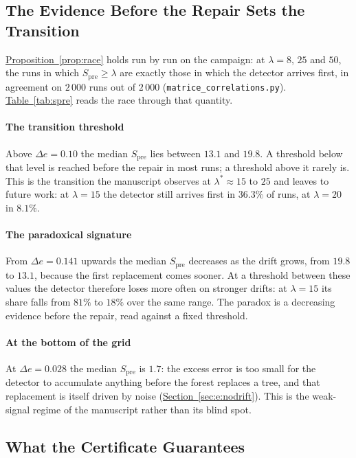 \documentclass[10pt,conference]{IEEEtran}
\theoremstyle{definition}
\begin{document}
\subsection{The Evidence Before the Repair Sets the Transition}
\label{sec:spre}


\hyperref[prop:race]{Proposition~\ref*{prop:race}} holds run by run on the campaign: at $\lambda = 8$, $25$ and
$50$, the runs in which $S_{\mathrm{pre}} \ge \lambda$ are exactly those in which the
detector arrives first, in agreement on $2\,000$ runs out of $2\,000$
(\texttt{matrice\_correlations.py}). \hyperref[tab:spre]{Table~\ref*{tab:spre}} reads the race through that
quantity.

\paragraph{The transition threshold} Above $\Delta e = 0.10$ the median $S_{\mathrm{pre}}$
lies between $13.1$ and $19.8$. A threshold below that level is reached before the repair
in most runs; a threshold above it rarely is. This is the transition the manuscript observes
at $\lambda^* \approx 15$ to $25$ and leaves to future work: at $\lambda = 15$ the detector
still arrives first in $36.3\%$ of runs, at $\lambda = 20$ in $8.1\%$.

\paragraph{The paradoxical signature} From $\Delta e = 0.141$ upwards the median
$S_{\mathrm{pre}}$ decreases as the drift grows, from $19.8$ to $13.1$, because the first
replacement comes sooner. At a threshold between these values the detector therefore loses
more often on stronger drifts: at $\lambda = 15$ its share falls from $81\%$ to $18\%$ over
the same range. The paradox is a decreasing evidence before the repair, read against a
fixed threshold.

\paragraph{At the bottom of the grid} At $\Delta e = 0.028$ the median $S_{\mathrm{pre}}$
is $1.7$: the excess error is too small for the detector to accumulate anything before the
forest replaces a tree, and that replacement is itself driven by noise
(\hyperref[sec:e:nodrift]{Section~\ref*{sec:e:nodrift}}). This is the weak-signal regime of the manuscript rather than
its blind spot.

\subsection{What the Certificate Guarantees}
\end{document}
